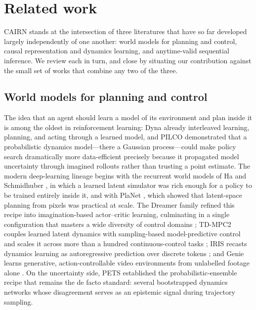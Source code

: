 \documentclass[preprint,12pt]{elsarticle}
\theoremstyle{definition}
\theoremstyle{remark}
\begin{document}
\section{Related work}\label{sec:related}

CAIRN stands at the intersection of three literatures that have so far
developed largely independently of one another: world models for
planning and control, causal representation and dynamics learning, and
anytime-valid sequential inference. We review each in turn, and close by
situating our contribution against the small set of works that combine
any two of the three.

\subsection{World models for planning and control}

The idea that an agent should learn a model of its environment and plan
inside it is among the oldest in reinforcement learning: Dyna
\citep{sutton1991dyna} already interleaved learning, planning, and
acting through a learned model, and PILCO \citep{deisenroth2011pilco}
demonstrated that a probabilistic dynamics model---there a Gaussian
process---could make policy search dramatically more data-efficient
precisely because it propagated model uncertainty through imagined
rollouts rather than trusting a point estimate. The modern deep-learning
lineage begins with the recurrent world models of Ha and Schmidhuber \citep{ha2018world},
in which a learned latent simulator was rich enough for a policy to be
trained entirely inside it, and with PlaNet \citep{hafner2019planet},
which showed that latent-space planning from pixels was practical at
scale. The Dreamer family refined this recipe into imagination-based
actor--critic learning, culminating in a single configuration that
masters a wide diversity of control domains \citep{hafner2025mastering};
TD-MPC2 couples learned latent dynamics with sampling-based
model-predictive control and scales it across more than a hundred
continuous-control tasks \citep{hansen2024tdmpc2}; IRIS recasts dynamics
learning as autoregressive prediction over discrete tokens
\citep{micheli2023transformers}; and Genie learns generative,
action-controllable video environments from unlabelled footage alone
\citep{bruce2024genie}. On the uncertainty side, PETS
\citep{chua2018deep} established the probabilistic-ensemble recipe that
remains the de facto standard: several bootstrapped dynamics networks
whose disagreement serves as an epistemic signal during trajectory
sampling.
\end{document}
